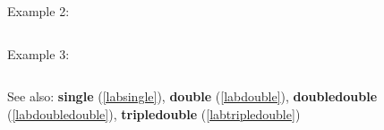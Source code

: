 \noindent Example 2: 
\begin{center}\begin{minipage}{15cm}\begin{Verbatim}[frame=single]
\end{Verbatim}
\end{minipage}\end{center}
\noindent Example 3: 
\begin{center}\begin{minipage}{15cm}\begin{Verbatim}[frame=single]
\end{Verbatim}
\end{minipage}\end{center}
See also: \textbf{single} (\ref{labsingle}), \textbf{double} (\ref{labdouble}), \textbf{doubledouble} (\ref{labdoubledouble}), \textbf{tripledouble} (\ref{labtripledouble})
